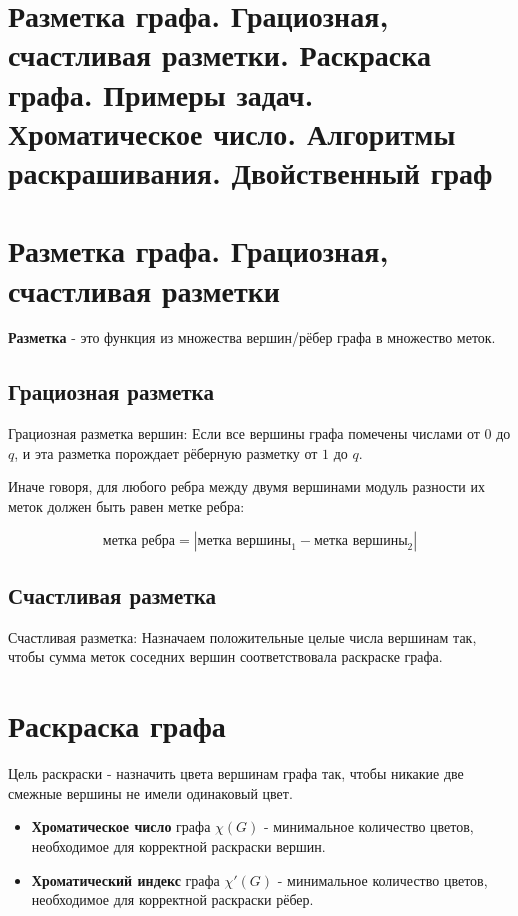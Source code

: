 {
	\section{Разметка графа. Грациозная, счастливая разметки. Раскраска графа. Примеры
задач. Хроматическое число. Алгоритмы раскрашивания. Двойственный граф}

\section*{Разметка графа. Грациозная, счастливая разметки}

\textbf{Разметка} - это функция из множества вершин/рёбер графа в множество меток.

\subsection*{Грациозная разметка}

Грациозная разметка вершин:  
Если все вершины графа помечены числами от $0$ до $q$, и эта разметка порождает рёберную разметку от $1$ до $q$.

Иначе говоря, для любого ребра между двумя вершинами модуль разности их меток должен быть равен метке ребра:


\[
\text{метка ребра} = |\text{метка вершины}_1 - \text{метка вершины}_2|
\]



\subsection*{Счастливая разметка}

Счастливая разметка:  
Назначаем положительные целые числа вершинам так, чтобы сумма меток соседних вершин соответствовала раскраске графа.

\section*{Раскраска графа}

Цель раскраски - назначить цвета вершинам графа так, чтобы никакие две смежные вершины не имели одинаковый цвет.

\begin{itemize}
  \item \textbf{Хроматическое число} графа $\chi(G)$ - минимальное количество цветов, необходимое для корректной раскраски вершин.
  \item \textbf{Хроматический индекс} графа $\chi'(G)$ - минимальное количество цветов, необходимое для корректной раскраски рёбер.
\end{itemize}

}
